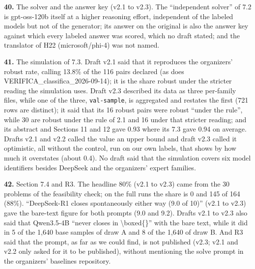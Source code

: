 \noindent\textbf{40.} The solver and the answer key (v2.1 to v2.3). The ``independent solver'' of 7.2 is gpt-oss-120b itself at a higher reasoning effort, independent of the labeled models but not of the generator; its answer on the original is also the answer key against which every labeled answer was scored, which no draft stated; and the translator of H22 (microsoft/phi-4) was not named.
\par

\noindent\textbf{41.} The simulation of 7.3. Draft v2.1 said that it reproduces the organizers' robust rate, calling 13.8\% of the 116 pairs declared (as does VERIFICA\_classifica\_2026-09-14); it is the share robust under the stricter reading the simulation uses. Draft v2.3 described its data as three per-family files, while one of the three, \texttt{val-sample}, is aggregated and restates the first (721 rows are distinct); it said that its 16 robust pairs were robust ``under the rule'', while 30 are robust under the rule of 2.1 and 16 under that stricter reading; and its abstract and Sections 11 and 12 gave 0.93 where its 7.3 gave 0.94 on average. Drafts v2.1 and v2.2 called the value an upper bound and draft v2.3 called it optimistic, all without the control, run on our own labels, that shows by how much it overstates (about 0.4). No draft said that the simulation covers six model identifiers besides DeepSeek and the organizers' expert families.
\par

\noindent\textbf{42.} Section 7.4 and R3. The headline 80\% (v2.1 to v2.3) came from the 30 problems of the feasibility check; on the full runs the share is 0 and 145 of 164 (88\%). ``DeepSeek-R1 closes spontaneously either way (9.0 of 10)'' (v2.1 to v2.3) gave the bare-text figure for both prompts (9.0 and 9.2). Drafts v2.1 to v2.3 also said that Qwen3.5-4B ``never closes in \textbackslash{}boxed\{\}'' with the bare text, while it did in 5 of the 1,640 base samples of draw A and 8 of the 1,640 of draw B. And R3 said that the prompt, as far as we could find, is not published (v2.3; v2.1 and v2.2 only asked for it to be published), without mentioning the solve prompt in the organizers' baselines repository.
\par

